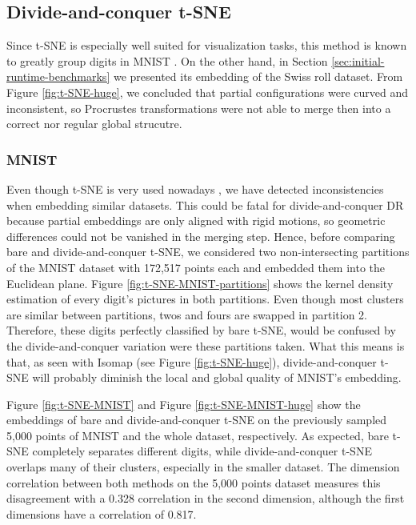 \subsection{Divide-and-conquer t-SNE}
\label{sec:dc-t-SNE}

Since t-SNE is especially well suited for visualization tasks, this method is known to greatly group digits in MNIST \citep{Vandermaaten2008}. On the other hand, in Section \ref{sec:initial-runtime-benchmarks} we presented its embedding of the Swiss roll dataset. From Figure \ref{fig:t-SNE-huge}, we concluded that partial configurations were curved and inconsistent, so Procrustes transformations were not able to merge then into a correct nor regular global strucutre.

\subsubsection{MNIST}

Even though t-SNE is very used nowadays \citep{Wattenberg2016}, we have detected inconsistencies when embedding similar datasets. This could be fatal for divide-and-conquer DR because partial embeddings are only aligned with rigid motions, so geometric differences could not be vanished in the merging step. Hence, before comparing bare and divide-and-conquer t-SNE, we considered two non-intersecting partitions of the MNIST dataset with 172,517 points each and embedded them into the Euclidean plane. Figure \ref{fig:t-SNE-MNIST-partitions} shows the kernel density estimation of every digit's pictures in both partitions. Even though most clusters are similar between partitions, twos and fours are swapped in partition 2. Therefore, these digits perfectly classified by bare t-SNE, would be confused by the divide-and-conquer variation were these partitions taken. What this means is that, as seen with Isomap (see Figure \ref{fig:t-SNE-huge}), divide-and-conquer t-SNE will probably diminish the local and global quality of MNIST's embedding.

Figure \ref{fig:t-SNE-MNIST} and Figure \ref{fig:t-SNE-MNIST-huge} show the embeddings of bare and divide-and-conquer t-SNE on the previously sampled 5,000 points of MNIST and the whole dataset, respectively. As expected, bare t-SNE completely separates different digits, while divide-and-conquer t-SNE overlaps many of their clusters, especially in the smaller dataset. The dimension correlation between both methods on the 5,000 points dataset measures this disagreement with a 0.328 correlation in the second dimension, although the first dimensions have a correlation of 0.817.

